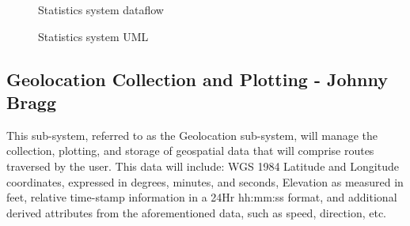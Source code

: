 \documentclass{article}
\begin{document}
\begin{figure}[H]
    \centering
    \begin{center}
    \end{center}
    \caption{Statistics system dataflow}
    \label{fig:my_label}
\end{figure}

\begin{figure}[H]
    \centering
    \begin{center}
    \end{center}
    \caption{Statistics system UML}
    \label{fig:my_label}
\end{figure}
\pagebreak

\subsection{Geolocation Collection and Plotting - Johnny Bragg}
This sub-system, referred to as the Geolocation sub-system, will manage the collection, plotting, and storage of geospatial data that will comprise routes traversed by the user. This data will include: WGS 1984 Latitude and Longitude coordinates, expressed in degrees, minutes, and seconds, Elevation as measured in feet, relative time-stamp information in a 24Hr hh:mm:ss format, and additional derived attributes from the aforementioned data, such as speed, direction, etc.
\end{document}
